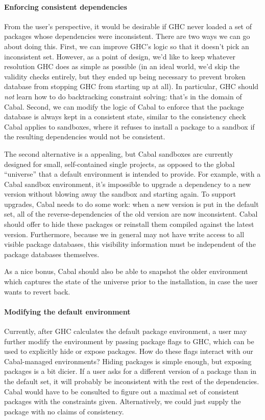 \documentclass{article}
\begin{document}
\paragraph{Enforcing consistent dependencies}  From the user's
perspective, it would be desirable if GHC never loaded a set of packages
whose dependencies were inconsistent.
There are two ways we can go
about doing this.  First, we can improve GHC's logic so that it doesn't
pick an inconsistent set.  However, as a point of design, we'd like to
keep whatever resolution GHC does as simple as possible (in an ideal
world, we'd skip the validity checks entirely, but they ended up being
necessary to prevent broken database from stopping GHC from starting up
at all). In particular, GHC should \emph{not} learn how to do
backtracking constraint solving: that's in the domain of Cabal.  Second,
we can modify the logic of Cabal to enforce that the package database is
always kept in a consistent state, similar to the consistency check
Cabal applies to sandboxes, where it refuses to install a package to a
sandbox if the resulting dependencies would not be consistent.

The second alternative is a appealing, but Cabal sandboxes are currently
designed for small, self-contained single projects, as opposed to the
global ``universe'' that a default environment is intended to provide.
For example, with a Cabal sandbox environment, it's impossible to
upgrade a dependency to a new version without blowing away the sandbox
and starting again.  To support upgrades, Cabal needs to do some work:
when a new version is put in the default set, all of the
reverse-dependencies of the old version are now inconsistent.  Cabal
should offer to hide these packages or reinstall them compiled against
the latest version.  Furthermore, because we in general may not have write
access to all visible package databases, this visibility information
must be independent of the package databases themselves.

As a nice bonus, Cabal should also be able to snapshot the older
environment which captures the state of the universe prior to the
installation, in case the user wants to revert back.

\paragraph{Modifying the default environment}  Currently, after GHC
calculates the default package environment, a user may further modify
the environment by passing package flags to GHC, which can be used to
explicitly hide or expose packages.  How do these flags interact with
our Cabal-managed environments?  Hiding packages is simple enough,
but exposing packages is a bit dicier.  If a user asks for a different
version of a package than in the default set, it will probably be
inconsistent with the rest of the dependencies.  Cabal would have to
be consulted to figure out a maximal set of consistent packages with
the constraints given.  Alternatively, we could just supply the package
with no claims of consistency.
\end{document}
